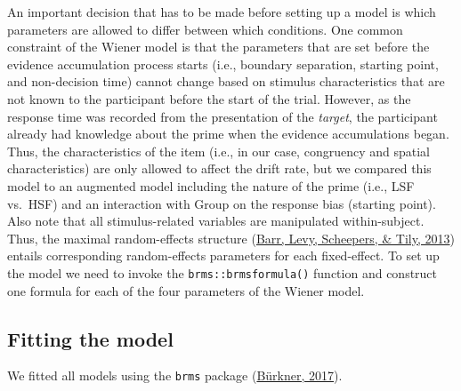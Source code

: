 \documentclass[
  11pt,
  english,
  ,doc,floatsintext]{apa6}
\begin{document}
An important decision that has to be made before setting up a model is which parameters are allowed to differ between which conditions. One common constraint of the Wiener model is that the parameters that are set before the evidence accumulation process starts (i.e., boundary separation, starting point, and non-decision time) cannot change based on stimulus characteristics that are not known to the participant before the start of the trial. However, as the response time was recorded from the presentation of the \emph{target}, the participant already had knowledge about the prime when the evidence accumulations began. Thus, the characteristics of the item (i.e., in our case, congruency and spatial characteristics) are only allowed to affect the drift rate, but we compared this model to an augmented model including the nature of the prime (i.e., LSF vs.~HSF) and an interaction with Group on the response bias (starting point). Also note that all stimulus-related variables are manipulated within-subject. Thus, the maximal random-effects structure (\protect\hyperlink{ref-barr_random_2013-1}{Barr, Levy, Scheepers, \& Tily, 2013}) entails corresponding random-effects parameters for each fixed-effect. To set up the model we need to invoke the \texttt{brms::brmsformula()} function and construct one formula for each of the four parameters of the Wiener model.

\hypertarget{fitting-the-model}{%
\subsection{Fitting the model}\label{fitting-the-model}}

We fitted all models using the \texttt{brms} package (\protect\hyperlink{ref-R-brms_a}{Bürkner, 2017}).
\end{document}
